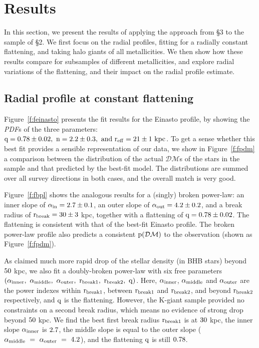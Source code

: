 \documentclass[12pt,preprint]{aastex}
\newcommand{\DM}{\mathcal{DM}}
\begin{document}
\section{Results}
In this section, we present the results of applying the approach from \S 3 to the sample of \S 2. 
We first focus on the radial profiles, fitting for a radially constant flattening, and taking halo giants of all metallicities. We then show how these results compare for subsamples of different metallicities, and explore radial variations of the flattening, and their impact on the radial profile estimate. 

\subsection{Radial profile at constant flattening}

Figure~\ref{f:feinasto} presents the fit results for the Einasto profile, by showing the \textit{PDF}s of the three parameters: $\rm q=0.78\pm0.02,~n=2.2\pm0.3,~and ~r_{eff}=21\pm1~kpc$. To get a sense whether this best fit provides a sensible representation of our data, we show in Figure~\ref{f:fpdm}
a comparison between the distribution of the actual $\DM$s of the stars in the sample and that predicted by the best-fit model. The distributions are summed over all survey directions in both cases, and the overall match is very good. 

Figure~\ref{f:fbpl} shows the analogous results for a (singly) broken power-law: an inner slope of $\rm \alpha_{in}=2.7\pm0.1$, an outer slope of $\rm \alpha_{out}=4.2\pm0.2$, and a break radius of
 $\rm r_{break}=30\pm3~$kpc, together with a flattening of $\rm q=0.78\pm0.02$. The flattening is consistent with that of the best-fit Einasto profile. The broken power-law profile also predicts a consistent $\rm p(\DM)$ to the observation (shown as Figure~\ref{f:fpdm}).
 
As \citet{Deason2014} claimed much more rapid drop of the stellar density (in BHB stars) beyond $\rm 50~$kpc, we also fit a doubly-broken power-law with six free parameters $\rm \left(\alpha_{inner},~\alpha_{middle},~\alpha_{outer},~r_{break1},~r_{break2},~q\right)$. Here, $\rm \alpha_{inner}$, $\rm \alpha_{middle}$ and $\rm \alpha_{outer}$ are the power indexes within $\rm r_{break1}$, between $\rm r_{break1}$ and $\rm r_{break2}$, and beyond $\rm r_{break2}$ respectively, and $\rm q$ is the flattening. However, the K-giant sample provided no constraints on a second break radius, which means no evidence of strong drop beyond $\rm 50~$kpc. We find the best first break radius $\rm r_{break1}$ is at $\rm 30~$kpc, the inner slope $\rm \alpha_{inner}$ is $\rm 2.7$, the middle slope is equal to the outer slope ($\rm \alpha_{middle}~=~ \alpha_{outer}~=~4.2$), and the flattening $\rm q$ is still $\rm 0.78$.
\end{document}
